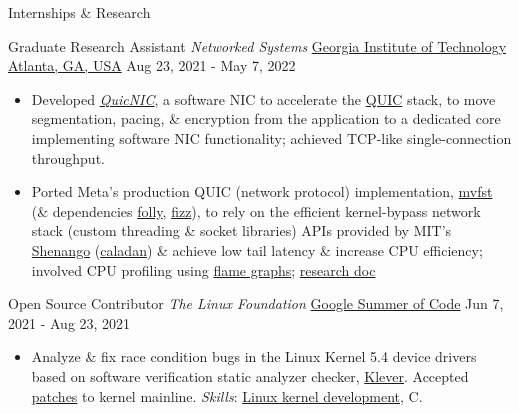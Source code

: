 \documentclass[]{mcdowellcv}
\begin{document}
\begin{cvsection}{Internships \& Research}
  \begin{cvsubsection}
    {Graduate Research Assistant \linebreak \textit{Networked Systems}}
    {\href{https://scs.gatech.edu/}{Georgia Institute of Technology \linebreak Atlanta, GA, USA}}
    {Aug 23, 2021 - May 7, 2022}
    \begin{itemize}
      \item
            Developed
            \href{https://github.com/saubhik/caladan/pulls}{\textit{QuicNIC}},
            a software NIC to accelerate the \href{https://quicwg.org/}{QUIC}
            stack, to move segmentation, pacing, \& encryption from the
            application to a dedicated core implementing software NIC
            functionality; achieved TCP-like single-connection throughput.
      \item
            Ported Meta's production QUIC (network protocol) implementation,
            \href{https://github.com/facebookincubator/mvfst}{mvfst} (\&
            dependencies \href{https://github.com/facebook/folly}{folly},
            \href{https://github.com/facebookincubator/fizz}{fizz}), to rely on
            the efficient kernel-bypass network stack (custom threading \&
            socket libraries) APIs provided by MIT's
            \href{https://www.usenix.org/conference/nsdi19/presentation/ousterhout}{Shenango}
            (\href{https://github.com/shenango/caladan}{caladan}) \& achieve low
            tail latency \& increase CPU efficiency; involved CPU profiling
            using
            \href{https://www.brendangregg.com/FlameGraphs/cpuflamegraphs.html}{flame
              graphs};
            \href{https://drive.google.com/file/d/1-y7gsG67KGIeD2qhomVT0vTPlPB4Vep1/view?usp=sharing}{research
              doc}
    \end{itemize}
  \end{cvsubsection}

  \begin{cvsubsection}
    {Open Source Contributor \linebreak \textit{The Linux Foundation}}
    {\href{https://summerofcode.withgoogle.com/archive/2021/projects/4818588170452992}{Google Summer of Code}}
    {Jun 7, 2021 - Aug 23, 2021}
    \begin{itemize}
      \item
            Analyze \& fix race condition bugs in the Linux Kernel 5.4 device
            drivers based on software verification static analyzer checker,
            \href{https://forge.ispras.ru/projects/klever}{Klever}. Accepted
            \href{https://lore.kernel.org/lkml/?q=saubhik}{patches} to kernel
            mainline. \textit{Skills}: \href{https://www.kernel.org/}{Linux
              kernel development}, C.
    \end{itemize}
  \end{cvsubsection}
\end{cvsection}
\end{document}

